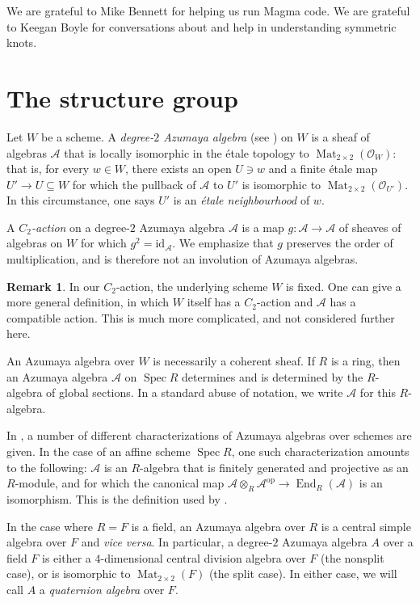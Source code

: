 \documentclass[reqno,oneside,dvipsnames,pdfnames,final]{amsart}
\theoremstyle{definition}
\newtheorem{remk}[thm]{Remark}
\DeclareMathOperator{\Spec}{Spec}
\newcommand{\sh}[1]{\mathcal{#1}}
\newcommand{\tensor}{\otimes}
\newcommand{\op}{\mathrm{op}}
\newcommand{\Mat}{\operatorname{Mat}}
\newcommand{\id}{\mathrm{id}}
\newcommand{\End}{\operatorname{End}}
\begin{document}
We are grateful to Mike Bennett for helping us run Magma code. We are grateful to Keegan Boyle for conversations about and help in understanding symmetric knots.

\section{The structure group}
\label{sec:structure-group}


Let $W$ be a scheme. A \emph{degree-$2$ Azumaya algebra} (see \cite[\S 5]{Grothendieck1968}) on $W$ is a sheaf of algebras $\mathcal{A}$ that is locally isomorphic in the étale topology to $\Mat_{2\times 2}(\sh O_W)$: that is, for every $w \in W$, there exists an open $U \ni w$ and a finite étale map $U' \to U \subseteq W$ for which the pullback of $\sh A$ to $U'$ is isomorphic to $\Mat_{2 \times 2}(\sh O_{U'})$. In this circumstance, one says $U'$ is an \emph{étale neighbourhood} of $w$.

A \emph{$C_2$-action} on a degree-$2$ Azumaya algebra $\sh A$ is a map  $g : \sh A \to \sh A$ of sheaves of algebras on $W$ for which $g^2=\id_{\sh A}$. We emphasize that $g$ preserves the order of multiplication, and is therefore not an involution of Azumaya algebras.

\begin{remk}
  In our $C_2$-action, the underlying scheme $W$ is fixed. One can give a more general definition, in which $W$ itself has a $C_2$-action and $\sh A$ has a compatible action. This is much more complicated, and not considered further here.
\end{remk}


An Azumaya algebra over $W$ is necessarily a coherent sheaf. If $R$ is a ring, then an Azumaya algebra $\sh A$ on $\Spec R$ determines and is determined by the $R$-algebra of global sections. In a standard abuse of notation, we write $\sh A$ for this $R$-algebra.

In \cite[Thm.\ 5.1]{Grothendieck1968}, a number of different characterizations of Azumaya algebras over schemes are given. In the case of an affine scheme $\Spec R$, one such characterization amounts to the following: $\sh A$ is an $R$-algebra that is finitely generated and projective as an $R$-module, and for which the canonical map $\sh A \tensor_R \sh A^{\op} \to \End_R(\sh A)$ is an isomorphism. This is the definition used by \cite{Auslander1960}.

In the case where $R=F$ is a field, an Azumaya algebra over $R$ is a central simple algebra over $F$ and \textit{vice versa}. In particular, a degree-$2$ Azumaya algebra $A$ over a field $F$ is either a $4$-dimensional central division algebra over $F$ (the nonsplit case), or is isomorphic to $\Mat_{2 \times 2}(F)$ (the split case). In either case, we will call $A$ a \emph{quaternion algebra} over $F$.
\end{document}
